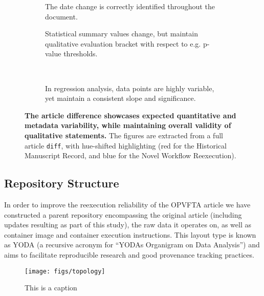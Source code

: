 \begin{figure}
	\centering
	\begin{subfigure}{0.49\textwidth}
		\centering
		\caption{
			The date change is correctly identified throughout the document.
		}
		\label{fig:diff_date}
	\end{subfigure}
	\hfill
	\begin{subfigure}{0.49\textwidth}
		\centering
		\caption{
			Statistical summary values change, but maintain qualitative evaluation bracket with respect to e.g. p-value thresholds.
		}
		\label{fig:diff_text}
	\end{subfigure}
	\\
	\vspace{1em}
	\begin{subfigure}{0.99\textwidth}
		\centering
		\caption{
			In regression analysis, data points are highly variable, yet maintain a consistent slope and significance.
		}
		\label{fig:diff_fig}
	\end{subfigure}
	\caption{
		\textbf{The article difference showcases expected quantitative and metadata variability, while maintaining overall validity of qualitative statements.}
		The figures are extracted from a full article \texttt{diff}, with hue-shifted highlighting (red for the Historical Manuscript Record, and blue for the Novel Workflow Reexecution).
	}
	\label{fig:diff}
\end{figure}


\subsection{Repository Structure}
In order to improve the reexecution reliability of the OPVFTA article we have constructed a parent repository encompassing the original article (including updates resulting as part of this study), the raw data it operates on, as well as container image and container execution instructions.
This layout type is known as YODA (a recursive acronym for “YODAs Organigram on Data Analysis”) and aims to facilitate reproducible research and good provenance tracking practices.

\begin{figure}
	\centering
	\texttt{[image: figs/topology]}
	\caption{
		This is a caption
	}
	\label{fig:topology}
\end{figure}

